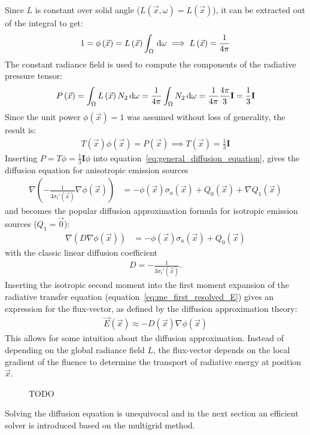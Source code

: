 Since $L$ is constant over solid angle ($L(\vec{x}, \omega)=L(\vec{x})$), it can be extracted out of the integral to get:
\begin{align*}
1 = \phi\left(\vec{x}\right) = L\left(\vec{x}\right)\int_\Omega{\,\mathrm{d}\omega}\implies L\left(\vec{x}\right) = \frac{1}{4\pi}
\end{align*}
The constant radiance field is used to compute the components of the radiative pressure tensor:
\begin{align*}
P\left(\vec{x}\right) 
= \int_\Omega{L\left(\vec{x}\right)N_2\,\mathrm{d}\omega}
= \frac{1}{4\pi}\int_\Omega{N_2\,\mathrm{d}\omega}
= \frac{1}{4\pi}\frac{4\pi}{3}\mathbf{I}
= \frac{1}{3}\mathbf{I}
\end{align*}
Since the unit power $\phi(\vec{x})=1$ was assumed without loss of generality, the result is:
\begin{align*}
T(\vec{x})\phi(\vec{x}) = P(\vec{x}) \implies T(\vec{x})=\frac{1}{3}\mathbf{I}
\end{align*}
Inserting $P=T\phi=\frac{1}{3}\mathbf{I}\phi$ into equation~\ref{eq:general_diffusion_equation}, gives the diffusion equation for anisotropic emission sources
\begin{align}
\label{eq:diffusion_equation_anisotropic_Q}
\nabla
\left(
-\frac{1}{3\sigma_t'\left(\vec{x}\right)}
\nabla \phi\left(\vec{x}\right)
\right)&=
-\phi(\vec{x})\sigma_a(\vec{x})
+Q_0\left(\vec{x}\right)
+\nabla Q_1\left(\vec{x}\right)
\end{align}
and becomes the popular diffusion approximation formula for isotropic emission sources ($Q_1=\vec{0}$):
\begin{align}
\label{eq:diffusion_equation_anisotropic_Q}
\nabla
\left(
D
\nabla \phi\left(\vec{x}\right)
\right)&=
-\phi(\vec{x})\sigma_a(\vec{x})
+Q_0\left(\vec{x}\right)
\end{align}
with the classic linear diffusion coefficient
\begin{align}
D=-\frac{1}{3\sigma_t'\left(\vec{x}\right)}
.
\label{eq:da_D}
\end{align}
Inserting the isotropic second moment into the first moment expansion of the radiative transfer equation (equation~\ref{eq:me_first_resolved_E}) gives an expression for the flux-vector, as defined by the diffusion approximation theory:
\begin{align}
\label{eq:diffusion_ficks_law}
\vec{E}\left(\vec{x}\right) \approx -D\left(\vec{x}\right)\nabla\phi\left(\vec{x}\right)
\end{align}
This allows for some intuition about the diffusion approximation. Instead of depending on the global radiance field $L$, the flux-vector depends on the local gradient of the fluence to determine the transport of radiative energy at position $\vec{x}$.
\begin{figure}[h]
\centering
{}
\caption{TODO}
\label{fig:da_moment_problem_flux_as_fluence_gradient}
\end{figure}
Solving the diffusion equation is unequivocal and in the next section an efficient solver is introduced based on the multigrid method.
